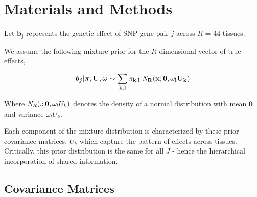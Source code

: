
\section*{Materials and Methods}

Let  $\bm{b_{j}}$ represents the genetic effect of SNP-gene pair $j$ across $R$ = 44 tissues.

We assume the following mixture prior for the $R$ dimensional vector of true effects,  

 \begin{equation}
  \bm{b_{j}} | \bm{\pi},\bf{U}, \bm{\omega} \sim \sum_{k,l} \pi_{k,l} \;{\it N}_R(x; \bm{0}, \omega_l U_{k})
\end{equation}

Where ${\it N}_R(.; \bm{0}, \omega_l U_{k})$ denotes the density of a normal distribution with mean $\bm{0}$ and variance $\omega_l U_{k}$.


Each component of the mixture distribution is characterized by these prior covariance matrices, $U_{k}$ which capture the pattern of effects across tissues. Critically, this prior distribution is the same for all $J$ - hence the hierarchical incorporation of shared information.

\subsection{Covariance Matrices}\label{sssec:num1}

